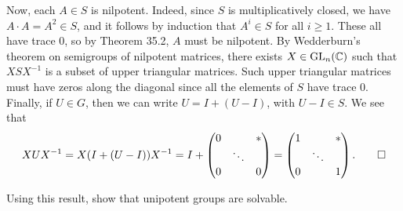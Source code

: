 \begin{pf}
    Now, each $A \in S$ is nilpotent. Indeed, since $S$ is multiplicatively 
    closed, we have $A \cdot A = A^2 \in S$, and it follows by induction that 
    $A^i \in S$ for all $i \geq 1$. These all have trace $0$, so by Theorem 35.2, 
    $A$ must be nilpotent. By Wedderburn's theorem on semigroups of nilpotent 
    matrices, there exists $X \in \operatorname{GL}_n(\mathbb{C})$ such that $XSX^{-1}$ is a subset of 
    upper triangular matrices. Such upper triangular matrices must have zeros along 
    the diagonal since all the elements of $S$ have trace $0$. Finally, if 
    $U \in G$, then we can write $U = I + (U - I)$, with $U - I \in S$. We see that 
    \[ XUX^{-1} = X(I + (U - I))X^{-1} = I + \begin{pmatrix}
        0 & & * \\ & \ddots & \\ 0 & & 0 
    \end{pmatrix} = \begin{pmatrix}
        1 & & * \\ & \ddots & \\ 0 & & 1 
    \end{pmatrix}. \qedhere \] 
\end{pf}

\begin{exercise}{}
    Using this result, show that unipotent groups are solvable. 
\end{exercise}

